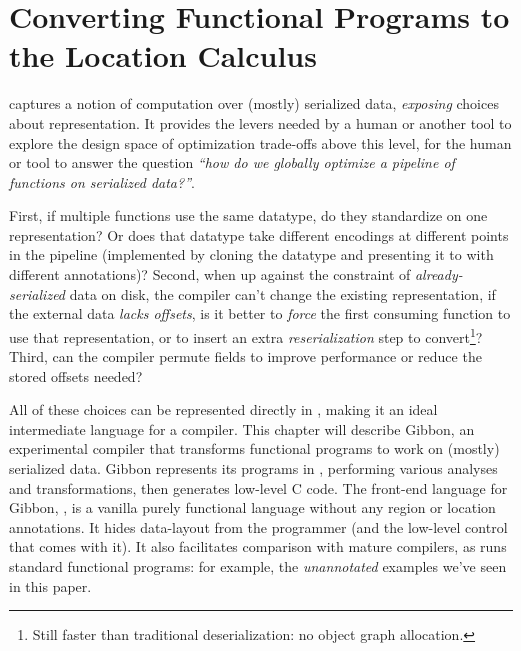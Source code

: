 \section{Converting Functional Programs to the Location Calculus}\label{sec:infer-local}

\ourcalc{} captures a notion of computation over (mostly) serialized data,
\emph{exposing} choices about representation. It provides the levers needed by a human
or another tool to explore the design space of optimization trade-offs above
this level, \ie{} for the human or tool to answer the question
\emph{``how do we globally optimize a pipeline of functions on serialized data?''}.

   First, if multiple functions use the same datatype, do they standardize on one
    representation?  Or does that datatype take different encodings at different
    points in the pipeline (implemented by cloning the datatype and
    presenting it to \ourcalc with different annotations)?
%
    Second, when up against the constraint of {\em already-serialized} data on
    disk, the compiler can't change the existing representation, if the
    external data \emph{lacks offsets}, is it better to \emph{force}
    the first consuming function to use that representation, or to insert an
    extra {\em reserialization} step to convert\footnote{Still faster
    than traditional deserialization: no object graph allocation.}?
%
    Third, can the compiler permute fields to improve performance or reduce the
    stored offsets needed?


    All of these choices can be represented directly in \ourcalc, making it an
    ideal intermediate language for a compiler. This chapter will describe Gibbon,
    an experimental compiler that transforms functional programs to work on
    (mostly) serialized data. Gibbon represents its programs in \ourcalc,
    performing various analyses and transformations, then generates low-level C code.
%
The front-end language for Gibbon, \lamadt, is a vanilla purely functional
language without any region or location
annotations.  It hides data-layout from the programmer (and the low-level
control that comes with it).  It also facilitates comparison with
mature compilers, as \lamadt runs standard functional programs:
for example, the {\em unannotated} examples we've seen in this paper.

